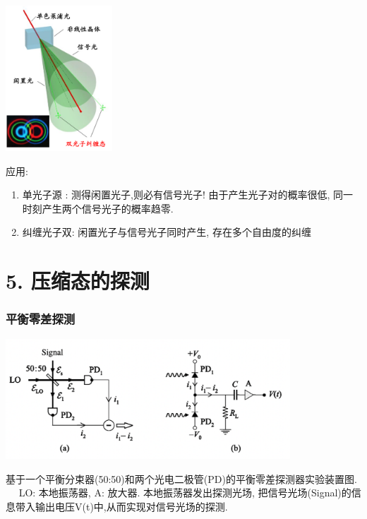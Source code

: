 \begin{frame}
    \frametitle{}
    \begin{center}
        \includegraphics[width=0.3\textwidth]{figs/32.png}
    \end{center} 
    应用:
 \begin{enumerate}
     \item 单光子源 : 测得闲置光子,则必有信号光子! 由于产生光子对的概率很低, 同一时刻产生两个信号光子的概率趋零.  
     \item 纠缠光子双: 闲置光子与信号光子同时产生, 存在多个自由度的纠缠
 \end{enumerate} 
\end{frame}


\section{5. 压缩态的探测}

\begin{frame}
    \frametitle{平衡零差探测}
           \begin{center}
                \includegraphics[width=0.8\textwidth]{figs/14.png}
           \end{center}
       基于一个平衡分束器(50:50)和两个光电二极管(PD)的平衡零差探测器实验装置图. ~~  
       LO: 本地振荡器, A: 放大器. 本地振荡器发出探测光场, 把信号光场(Signal)的信息带入输出电压V(t)中,从而实现对信号光场的探测.  
   \end{frame}
   
